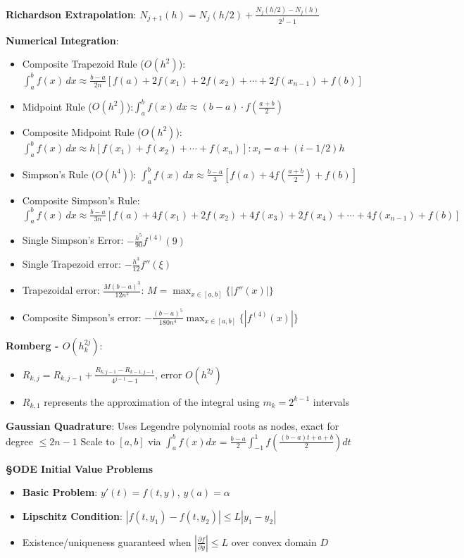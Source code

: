 \documentclass{article}
\begin{document}
\begin{minipage}[t]{0.49\textwidth}
\textbf{Richardson Extrapolation}: $N_{j+1}(h) = N_j(h/2) + \frac{N_j(h/2) - N_j(h)}{2^{j}-1}$

\textbf{Numerical Integration}:
\begin{itemize}\setlength{\itemsep}{-1pt}
\item Composite Trapezoid Rule ($O(h^2)$): \\$\int_a^b f(x)\,dx \approx \frac{b-a}{2n}[f(a) +2f(x_1) + 2f(x_2)+\cdots+2f(x_{n-1}) + f(b)]$
\item Midpoint Rule ($O(h^2)$):$\int_a^b f(x)\,dx \approx (b-a)\cdot f(\frac{a+b}{2})$
\item Composite Midpoint Rule ($O(h^2)$): \\$\int_a^b f(x)\,dx \approx h[f(x_1)+f(x_2)+\cdots+f(x_n)]:x_i=a+(i-1/2)h$
\item Simpson's Rule ($O(h^4)$): $\int_a^b f(x)\,dx \approx \frac{b-a}{3}\left[f(a) + 4f\left(\frac{a+b}{2}\right) + f(b)\right]$
\item Composite Simpson's Rule:\\ $\int_a^b f(x)\,dx \approx \frac{b-a}{3n}\left[f(a) + 4f(x_1) + 2f(x_2) + 4f(x_3) + 2f(x_4) + \cdots + 4f(x_{n-1}) + f(b)\right]$
\item Single Simpson's Error: $-\frac{h^5}{90}f^{(4)}(9)$
\item Single Trapezoid error: $-\frac{h^3}{12}f''(\xi)$  
\item Trapezoidal error: $\frac{M(b-a)^3}{12n^2}$: $M=\max_{x\in[a,b]}\{|f''(x)|\}$
\item Composite Simpson's error: $-\frac{(b-a)^5}{180n^4}\max_{x\in[a,b]}\{|f^{(4)}(x)|\}$
\end{itemize}

\textbf{Romberg - $O(h_k^{2j})$}: 
\begin{itemize}
    \item{$R_{k,j} = R_{k,j-1} + \frac{R_{k,j-1} - R_{k-1,j-1}}{4^{j-1}-1}$, error $O(h^{2j})$}
    \item{$R_{k,1}$ represents the approximation of the integral using $m_k=2^{k-1}$ intervals}
\end{itemize}

\textbf{Gaussian Quadrature}: Uses Legendre polynomial roots as nodes, exact for degree $\leq 2n-1$
Scale to $[a,b]$ via $\int_a^b f(x)dx = \frac{b-a}{2}\int_{-1}^1 f\left(\frac{(b-a)t + a + b}{2}\right)dt$

\textbf{\S ODE Initial Value Problems}
\begin{itemize}
\item \textbf{Basic Problem}: $y'(t) = f(t,y)$, $y(a) = \alpha$
\item \textbf{Lipschitz Condition}: $|f(t,y_1) - f(t,y_2)| \leq L|y_1 - y_2|$ 
\item Existence/uniqueness guaranteed when $|\frac{\partial f}{\partial y}| \leq L$ over convex domain $D$
\end{itemize}


\end{minipage}
\end{document}

